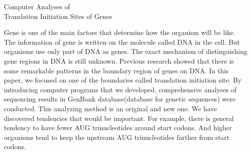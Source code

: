 \begin{LARGE}
\begin{center}
Computer Analyses of\\ Translation Initiation Sites of Genes
\end{center}
\end{LARGE}

\vspace{4ex}
\begin{small}
Gene is one of the main factors that determine how the organism will
be like. The information of gene is written on the molecule called DNA
in the cell. But organisms use only part of DNA as genes. The exact
mechanism of distinguishing gene regions in DNA is still unknown.
Previous research showed that there is some remarkable patterns in the 
boundary region of genes on DNA. 
In this paper, we focused on one of the boundaries called translation
initiation site. 
By introducing computer programs that we developed, comprehensive analyses
of sequencing results 
 in GenBank database(database for genetic sequences) were conducted.
This analyzing method is an original and new one.
We have discovered tendencies that would be important. For
example, there  
is general tendency to have fewer AUG trinucleotides around start
codons. And higher organisms tend to keep the upstream AUG trinucleotides
farther from start codons.  \\ 

\end{small}

